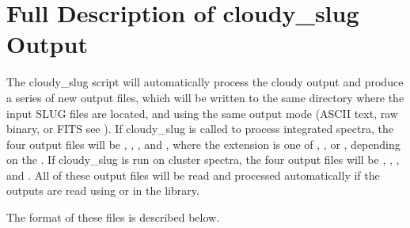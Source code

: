 \documentclass[letterpaper,10pt,english]{sphinxmanual}
\begin{document}
\section{Full Description of cloudy\_slug Output}
\label{\detokenize{cloudy:ssec-cloudy-output}}\label{\detokenize{cloudy:full-description-of-cloudy-slug-output}}
The cloudy\_slug script will automatically process the cloudy output
and produce a series of new output files, which will be written to the
same directory where the input SLUG files are located, and using the
same output mode (ASCII text, raw binary, or FITS \textendash{} see
{\hyperref[\detokenize{output:sec-output}]{}}). If cloudy\_slug is called to process integrated
spectra, the four output files will be
,
,
, and
, where the extension 
is one of , , or , depending on the
. If cloudy\_slug is run on cluster spectra, the four
output files will be
,
,
, and
. All of these output files will
be read and processed automatically if the outputs are read using
 or  in the {\hyperref[\detokenize{slugpy:sec-slugpy}]{}}
library.

The format of these files is described below.
\end{document}
